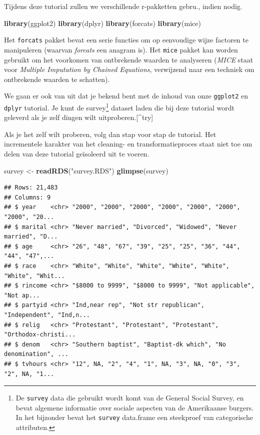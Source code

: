 \documentclass[]{tufte-book}
\newenvironment{Shaded}{}{}
\newcommand{\KeywordTok}[1]{\textcolor[rgb]{0.00,0.44,0.13}{\textbf{#1}}}
\newcommand{\NormalTok}[1]{#1}
\newcommand{\StringTok}[1]{\textcolor[rgb]{0.25,0.44,0.63}{#1}}
\begin{document}
Tijdens deze tutorial zullen we verschillende r-pakketten gebru., indien nodig.

\begin{Shaded}
\begin{Highlighting}[]
\KeywordTok{library}\NormalTok{(ggplot2)}
\KeywordTok{library}\NormalTok{(dplyr)}
\KeywordTok{library}\NormalTok{(forcats)}
\KeywordTok{library}\NormalTok{(mice)}
\end{Highlighting}
\end{Shaded}

Het \texttt{forcats} pakket bevat een serie functies om op eenvoudige wijze factoren te manipuleren (waarvan \emph{forcats} een anagram is). Het \texttt{mice} pakket kan worden gebruikt om het voorkomen van ontbrekende waarden te analyseren (\emph{MICE} staat voor \emph{Multiple Imputation by Chained Equations}, verwijzend naar een techniek om ontbrekende waarden te schatten).

We gaan er ook van uit dat je bekend bent met de inhoud van onze \texttt{ggplot2} en \texttt{dplyr} tutorial. Je kunt de survey\footnote{De \texttt{survey} data die gebruikt wordt komt van de General Social Survey, en bevat algemene informatie over sociale aspecten van de Amerikaanse burgers. In het bijzonder bevat het \texttt{survey} data.frame een steekproef van categorische attributen.} dataset laden die bij deze tutorial wordt geleverd als je zelf dingen wilt uitproberen.{[}\^{}try{]}

Als je het zelf wilt proberen, volg dan stap voor stap de tutorial. Het incrementele karakter van het cleaning- en transformatieproces staat niet toe om delen van deze tutorial geïsoleerd uit te voeren.

\begin{Shaded}
\begin{Highlighting}[]
\NormalTok{survey <-}\StringTok{ }\KeywordTok{readRDS}\NormalTok{(}\StringTok{"survey.RDS"}\NormalTok{)}
\KeywordTok{glimpse}\NormalTok{(survey)}
\end{Highlighting}
\end{Shaded}

\begin{verbatim}
## Rows: 21,483
## Columns: 9
## $ year    <chr> "2000", "2000", "2000", "2000", "2000", "2000", "2000", "20...
## $ marital <chr> "Never married", "Divorced", "Widowed", "Never married", "D...
## $ age     <chr> "26", "48", "67", "39", "25", "25", "36", "44", "44", "47",...
## $ race    <chr> "White", "White", "White", "White", "White", "White", "Whit...
## $ rincome <chr> "$8000 to 9999", "$8000 to 9999", "Not applicable", "Not ap...
## $ partyid <chr> "Ind,near rep", "Not str republican", "Independent", "Ind,n...
## $ relig   <chr> "Protestant", "Protestant", "Protestant", "Orthodox-christi...
## $ denom   <chr> "Southern baptist", "Baptist-dk which", "No denomination", ...
## $ tvhours <chr> "12", NA, "2", "4", "1", NA, "3", NA, "0", "3", "2", NA, "1...
\end{verbatim}
\end{document}
